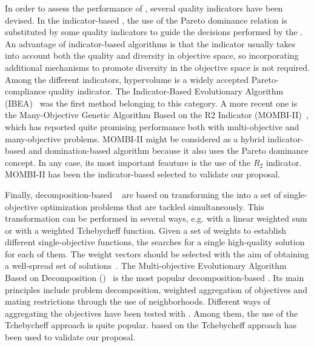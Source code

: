 In order to assess the performance of \MOEAS{}, several quality indicators have been devised.
%
In the indicator-based \MOEAS{}, the use of the Pareto dominance relation is substituted by some quality indicators to guide the decisions 
performed by the \MOEA{}.
%
An advantage of indicator-based algorithms is that the indicator usually takes into account both the quality and diversity in objective space, so incorporating additional mechanisms
to promote diversity in the objective space is not required.
%
Among the different indicators, hypervolume is a widely accepted Pareto-compliance quality indicator.
%
The Indicator-Based Evolutionary Algorithm (IBEA)~\cite{Joel:IBEA} was the first method belonging to this category.
%
A more recent one is the Many-Objective Genetic Algorithm Based on the R2 Indicator (MOMBI-II)~\cite{Joel:MOMBI-II}, which has reported quite promising performance both with multi-objective and 
many-objective problems.
%
MOMBI-II might be considered as a hybrid indicator-based and domination-based algorithm because it also uses the Pareto dominance concept. 
%
In any case, its most important feauture is the use of the $R_2$ indicator. %
%
MOMBI-II has been the indicator-based \MOEA{} selected to validate our proposal.

Finally, decomposition-based \MOEAS{}~\cite{Joel:MOEAD_AMS} are based on transforming the \MOP{} into a set of single-objective optimization problems that are tackled simultaneously.
%
This transformation can be performed in several ways, e.g. with a linear weighted sum or with a weighted Tchebycheff function. 
%
Given a set of weights to establish different single-objective functions, the \MOEA{} searches for a single high-quality solution for each of them. 
%
The weight vectors should be selected with the aim of obtaining a well-spread set of solutions~\cite{Joel:Kalyanmoy}.
%
%
The Multi-objective Evolutionary Algorithm Based on Decomposition (\MOEAD{})~\cite{Joel:MOEAD} is the most popular decomposition-based \MOEA{}. 
%
Its main principles include problem decomposition, weighted aggregation of objectives and mating restrictions through the use of neighborhoods. 
%
Different ways of aggregating the objectives have been tested with \MOEAD{}.
%
Among them, the use of the Tchebycheff approach is quite popular. 
%
\MOEAD{} based on the Tchebycheff approach has been used to validate our proposal.
 

